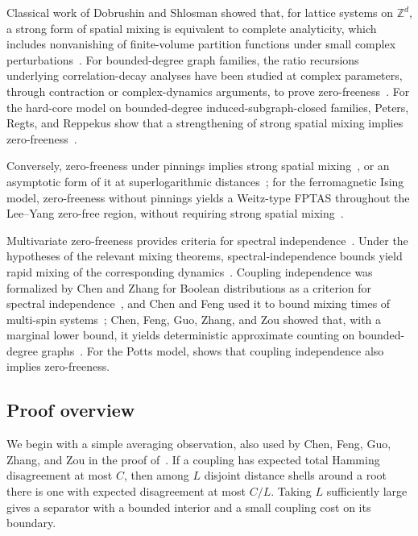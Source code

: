 \documentclass[11pt,reqno]{article}
\theoremstyle{plain}
\theoremstyle{definition}
\theoremstyle{remark}
\theoremstyle{definition}
\theoremstyle{remark}
\begin{document}
Classical work of Dobrushin and Shlosman showed that, for lattice systems
on \(\mathbb Z^d\), a strong form of spatial mixing is equivalent to
complete analyticity, which includes nonvanishing of finite-volume
partition functions under small complex
perturbations~\cite{DobrushinShlosman1985,DobrushinShlosman1987}.  For
bounded-degree graph families, the ratio recursions underlying
correlation-decay analyses have been studied at complex parameters,
through contraction or complex-dynamics arguments, to prove
zero-freeness~\cite{PetersRegts2019,LiuSinclairSrivastava2019,PetersRegts2020,ShaoSun2021,LiuSinclairSrivastava2025,ChenShaoShi2026}.
For the hard-core model on bounded-degree induced-subgraph-closed
families, Peters,
Regts, and Reppekus show that a strengthening of strong spatial mixing
implies zero-freeness~\cite{PetersRegtsReppekus2026}.

Conversely, zero-freeness under pinnings implies strong spatial
mixing~\cite{Regts2023,ShaoYe2024}, or an asymptotic form of it at
superlogarithmic distances~\cite{Gamarnik2023}; for the ferromagnetic
Ising model, zero-freeness without pinnings yields a Weitz-type FPTAS throughout the Lee--Yang
zero-free region, without requiring strong spatial
mixing~\cite{ShaoShi2026}.

Multivariate zero-freeness provides criteria for spectral
independence~\cite{ChenLiuVigoda2024}.  Under the hypotheses of the
relevant mixing theorems, spectral-independence bounds yield rapid mixing
of the corresponding dynamics~\cite{AnariLiuOveisGharan2020}.  Coupling
independence was
formalized by Chen and Zhang for Boolean distributions as a criterion
for spectral independence~\cite{ChenZhang2023}, and Chen and Feng used
it to bound mixing times of multi-spin systems~\cite{ChenFeng2024};
Chen, Feng, Guo, Zhang, and Zou showed that, with a marginal lower
bound, it yields deterministic approximate counting on bounded-degree
graphs~\cite{CFFGZZ2024}.  For the Potts model,
 shows that coupling independence also implies
zero-freeness.

\subsection{Proof overview}

We begin with a simple averaging observation, also used by Chen, Feng,
Guo, Zhang, and Zou in the proof of~\cite[Theorem~12]{CFFGZZ2024}.
If a coupling has expected total Hamming disagreement at most \(C\),
then among \(L\) disjoint distance shells around a root there is one
with expected disagreement at most \(C/L\).
Taking \(L\) sufficiently large gives a separator with a bounded interior
and a small coupling cost on its boundary.
\end{document}
